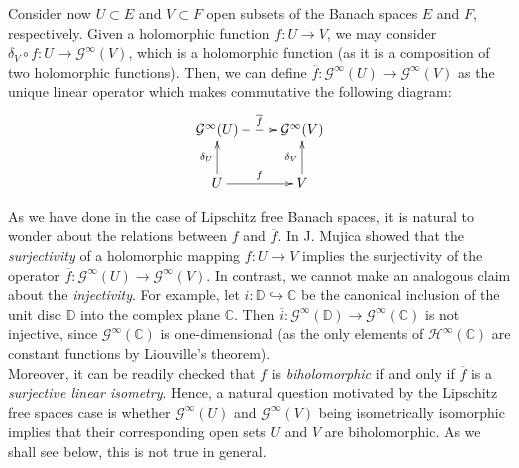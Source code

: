 \documentclass[12pt,leqno]{amsart}
\numberwithin{equation}{section} %
\theoremstyle{definition}
\numberwithin{equation}{section}
\begin{document}

Consider now $U\subset E$ and $V\subset F$ open subsets of the Banach spaces $E$ and $F$, respectively. Given a holomorphic function $f:U\to V$, we may consider $\delta_V\circ f:U\to \mathcal{G}^\infty(V)$, which is a holomorphic function (as it is a composition of two holomorphic functions). Then, we can define $\overline{f}:\mathcal{G}^\infty(U)\to \mathcal{G}^\infty(V)$ as the unique linear operator which makes commutative the following diagram:
$$
\xymatrix{\mathcal{G}^\infty(U)\ar@{-->}[r]^{\overline{f}}& \mathcal{G}^\infty(V)\\
     U\ar[r]^{f}\ar^{\delta_U}[u]& V\ar^{\delta_V}[u]}
$$

As we have done in the case of Lipschitz free Banach spaces, it is natural to wonder about the relations between $f$ and $\overline{f}$. In \cite[Theorem 5.2]{Mujica92} J. Mujica showed that the \textit{surjectivity} of a holomorphic mapping $f:U\to V$ implies the surjectivity of the operator $\overline{f}:\mathcal{G}^\infty(U)\to \mathcal{G}^\infty(V)$. In contrast, we cannot make an analogous claim about the \textit{injectivity}. For example, let $i:\mathbb{D}\hookrightarrow \mathbb{C}$ be the canonical inclusion of the unit disc $\mathbb{D}$ into the complex plane $\mathbb{C}$. Then $\overline{i}: \mathcal{G}^\infty(\mathbb{D})\to  \mathcal{G}^\infty(\mathbb{C})$ is not injective, since $\mathcal{G}^\infty(\mathbb{C})$ is one-dimensional (as the only elements of $\mathcal{H}^\infty(\mathbb{C})$ are constant functions by Liouville's theorem). \\

Moreover, it can be readily checked that
$f$ is \textit{biholomorphic} if and only if $\overline{f}$ is a \textit{surjective linear isometry}. 
Hence, a natural question motivated by the Lipschitz free spaces case is whether $\mathcal{G}^\infty(U)$ and $\mathcal{G}^\infty(V)$ being isometrically isomorphic implies that their corresponding open sets $U$ and $V$ are biholomorphic. As we shall see below, this is not true in general. \\
\end{document}

